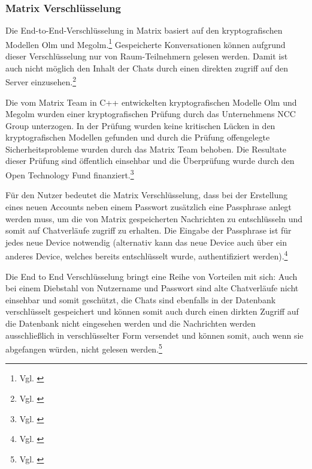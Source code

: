 \subsubsection{Matrix Verschlüsselung}\label{chapter:aemn}
Die End-to-End-Verschlüsselung in Matrix basiert auf den kryptografischen Modellen Olm und Megolm.\footnote{Vgl. \cite{Chishtie2018}}
Gespeicherte Konversationen können aufgrund dieser Verschlüsselung nur von Raum-Teilnehmern gelesen werden. Damit ist auch nicht möglich den Inhalt der Chats durch einen direkten zugriff auf den Server einzusehen.\footnote{Vgl. \cite[S. 1 ff.]{Nccgroup2016}}

Die vom Matrix  Team in C++ entwickelten kryptografischen Modelle Olm und Megolm  wurden einer kryptografischen Prüfung durch das Unternehmens NCC Group unterzogen. In der Prüfung wurden keine kritischen Lücken in den kryptografischen Modellen gefunden und durch die Prüfung offengelegte Sicherheitsprobleme wurden durch das Matrix Team behoben.  Die Resultate dieser Prüfung sind öffentlich einsehbar und die Überprüfung wurde durch den Open Technology Fund finanziert.\footnote{Vgl. \cite[S. 5 ff.]{Nccgroup2016}}

Für den Nutzer bedeutet die Matrix Verschlüsselung, dass bei der Erstellung eines neuen Accounts neben einem Passwort zusätzlich eine Passphrase anlegt werden muss, um die von Matrix gespeicherten Nachrichten zu entschlüsseln und somit auf Chatverläufe zugriff zu erhalten.
Die Eingabe der Passphrase ist für jedes neue Device notwendig (alternativ kann das neue Device auch über ein anderes Device, welches bereits entschlüsselt wurde, authentifiziert werden).\footnote{Vgl. \cite{Chishtie2018}}

Die End to End Verschlüsselung bringt eine Reihe von Vorteilen mit sich: Auch bei einem Diebstahl von Nutzername und Passwort sind alte Chatverläufe nicht einsehbar und somit geschützt, die Chats sind ebenfalls in der Datenbank verschlüsselt gespeichert und können somit auch durch einen dirkten Zugriff auf die Datenbank nicht eingesehen werden und die Nachrichten werden ausschließlich in verschlüsselter Form versendet und können somit, auch wenn sie abgefangen würden, nicht gelesen werden.\footnote{Vgl. \cite{Chishtie2018}}

